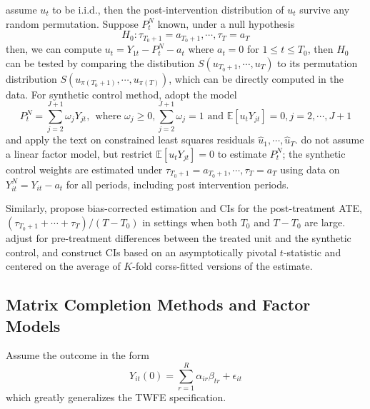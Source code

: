 \documentclass[twoside]{article}
\begin{document}
\begin{itemize}
    assume $u_t$ to be i.i.d., then the post-intervention distribution of $u_t$ survive any random permutation. Suppose $P^N_t$ known, under a null hypothesis $$ H_0:\tau_{T_0+1}=a_{T_0+1},\cdots,\tau_T=a_T $$
    then, we can compute $u_t = Y_{1t}-P^N_t-a_t$ where $a_t=0$ for $1\leq t\leq T_0$, then $H_0$ can be tested by comparing the distibution $S\left(u_{T_0+1},\cdots,u_T\right)$ to its permutation distribution $S\left(u_{\pi(T_0+1)},\cdots,u_{\pi(T)}\right)$, which can be directly computed in the data. For synthetic control method, \citet{chernozhukov2021exact} adopt the model $$ P^N_t=\sum^{J+1}_{j=2}\omega_jY_{jt},\ \ \text{where }\omega_j\geq 0,\sum^{J+1}_{j=2}\omega_j=1\text{ and }\mathbb{E}\left[u_tY_{jt}\right]=0,j=2,\cdots,J+1 $$
    and apply the text on constrained least squares residuals $\hat{u}_1,\cdots,\hat{u}_T$. \citet{chernozhukov2021exact} do not assume a linear factor model, but restrict $\mathbb{E}\left[u_tY_{jt}\right]=0$ to estimate $P^N_t$; the synthetic control weights are estimated under $\tau_{T_0+1}=a_{T_0+1},\cdots,\tau_T=a_T$ using data on $Y^N_{it}=Y_{it}-a_t$ for all periods, including post intervention periods.

    Similarly, \citet{chernozhukov2019practical} propose bias-corrected estimation and CIs for the post-treatment ATE, $ \left(\tau_{T_0+1}+\cdots+\tau_T\right)/(T-T_0) $ in settings when both $T_0$ and $T-T_0$ are large. \citet{chernozhukov2019practical} adjust for pre-treatment differences between the treated unit and the synthetic control, and construct CIs based on an asymptotically pivotal $t$-statistic and centered on the average of $K$-fold corss-fitted versions of the estimate.
\end{itemize}

\subsection{Matrix Completion Methods and Factor Models}

Assume the outcome in the form $$ Y_{it}(0) = \sum^R_{r=1}\alpha_{ir}\beta_{tr} + \epsilon_{it} $$
which greatly generalizes the TWFE specification.
\end{document}
